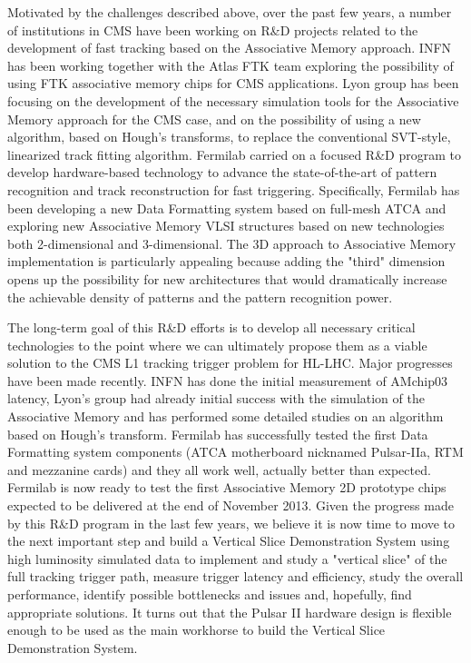 Motivated by the challenges described above, over the past few years, a number of institutions in CMS have been working on R\&D projects related to the development of fast tracking based on the Associative Memory approach. INFN has been working together with the Atlas FTK team exploring the possibility of using FTK associative memory chips for CMS applications. Lyon group has been focusing on the development of the necessary simulation tools for the Associative Memory approach for the CMS case, and on the possibility of using a new algorithm, based on Hough's transforms, to replace the conventional SVT-style, linearized track fitting algorithm. 
Fermilab carried on a focused R\&D program to develop hardware-based technology to advance the state-of-the-art of pattern recognition and track reconstruction for fast triggering. Specifically, Fermilab has been developing a new Data Formatting system based on full-mesh ATCA and exploring new Associative Memory VLSI structures based on new technologies both 2-dimensional and 3-dimensional. The 3D approach to Associative Memory implementation is particularly appealing because adding the "third" dimension opens up the possibility for new architectures that would dramatically increase the achievable density of patterns and the pattern recognition power. 

The long-term goal of this R\&D efforts is to develop all necessary critical technologies to the point where we can ultimately propose them as a viable solution to the CMS L1 tracking trigger problem for HL-LHC. Major progresses have been made recently. INFN has done the initial measurement of AMchip03 latency, Lyon's group had already initial success with the simulation of the Associative Memory and has performed some detailed studies on an algorithm based on Hough's transform. Fermilab has successfully tested the first Data Formatting system components (ATCA motherboard nicknamed Pulsar-IIa, RTM and mezzanine cards) and they all work well, actually better than expected. Fermilab is now ready to test the first Associative Memory 2D prototype chips expected to be delivered at the end of November 2013. Given the progress made by this R\&D program in the last few years, we believe it is now time to move to the next important step and build a Vertical Slice Demonstration System using high luminosity simulated data to implement and study a "vertical slice" of the full tracking trigger path, measure trigger latency and efficiency, study the overall performance, identify possible bottlenecks and issues and, hopefully, find appropriate solutions.  It turns out that the Pulsar II hardware design is flexible enough to be used as the main workhorse to build the Vertical Slice Demonstration System.


